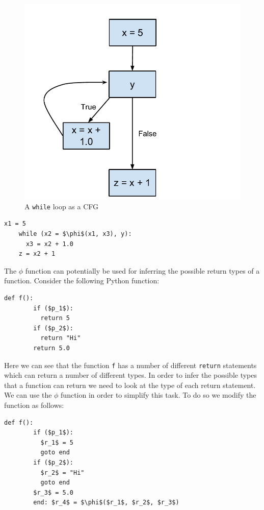 \documentclass[12pt, titlepage]{article}
\begin{document}
\begin{figure}
\centering
\includegraphics[scale=0.5]{images/ssaPhiNode.pdf}
\caption{A \texttt{while} loop as a CFG}
\label{fig:phiCFG}
\end{figure}

\begin{lstlisting}[mathescape]
    x1 = 5
    while (x2 = $\phi$(x1, x3), y):
      x3 = x2 + 1.0
    z = x2 + 1
\end{lstlisting}
The $\phi$ function can potentially be used for inferring the possible return types of a function. Consider the following Python function:
\begin{lstlisting}[mathescape]
    def f():
        if ($p_1$):
          return 5
        if ($p_2$):
          return "Hi"
        return 5.0
\end{lstlisting}
Here we can see that the function \texttt{f} has a number of different \texttt{return} statements which can return a number of different types. In order to infer the possible types that a function can return we need to look at the type of each return statement. We can use the $\phi$ function in order to simplify this task. To do so we modify the function as follows:
\begin{lstlisting}[mathescape]
    def f():
        if ($p_1$):
          $r_1$ = 5
          goto end
        if ($p_2$):
          $r_2$ = "Hi"
          goto end
        $r_3$ = 5.0
        end: $r_4$ = $\phi$($r_1$, $r_2$, $r_3$)
\end{lstlisting}
\end{document}

